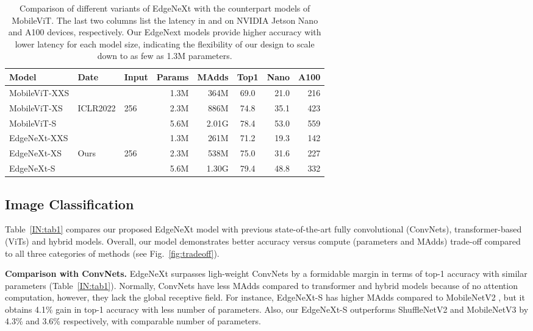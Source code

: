 \documentclass[runningheads]{llncs}
\renewcommand\arraystretch{1.0}
\begin{document}
\begin{table*}[!b]
\setlength{\tabcolsep}{4pt}
\renewcommand\arraystretch{1.0}
\caption{Comparison of different variants of EdgeNeXt with the counterpart models of MobileViT. The last two columns list the latency in  and  on NVIDIA Jetson Nano and A100 devices, respectively. Our EdgeNext models provide higher accuracy with lower latency for each model size, indicating the flexibility of our design to scale down to as few as 1.3M parameters.}
\begin{center}
\begin{tabular}{l l l r r c r r}
\toprule
\rowcolor{Gray}    Model     &   Date  & Input &  Params  & MAdds &   Top1 & Nano & A100  \\
\midrule
MobileViT-XXS  &    &  & 1.3M & 364M  & 69.0 & 21.0  & 216  \\
MobileViT-XS  &  ICLR2022  & 256 & 2.3M & 886M  & 74.8 & 35.1  & 423  \\
MobileViT-S  &    &  & 5.6M & 2.01G  & 78.4 & 53.0  & 559  \\
\midrule
\rowcolor{orange!6}  EdgeNeXt-XXS   &     &  & 1.3M & 261M & 71.2 & 19.3  & 142  \\
\rowcolor{orange!6}  EdgeNeXt-XS   &  Ours   & 256 & 2.3M & 538M & 75.0 & 31.6  &  227  \\
\rowcolor{orange!6}  EdgeNeXt-S   &     &  & 5.6M & 1.30G & 79.4 & 48.8  & 332  \\
\bottomrule 
\end{tabular}
\label{IN:tab2}
\end{center}
\end{table*}


\subsection{Image Classification}
Table~\ref{IN:tab1} compares our proposed EdgeNeXt model with previous state-of-the-art fully convolutional (ConvNets), transformer-based (ViTs) and hybrid models. Overall, our model demonstrates better accuracy versus compute (parameters and MAdds) trade-off compared to all three categories of methods (see Fig.~\ref{fig:tradeoff}). 

\noindent\textbf{Comparison with ConvNets.} EdgeNeXt surpasses ligh-weight ConvNets by a formidable margin in terms of top-1 accuracy with similar parameters (Table~\ref{IN:tab1}). Normally, ConvNets have less MAdds compared to transformer and hybrid models because of no attention computation, however, they lack the global receptive field. For instance, EdgeNeXt-S has higher MAdds compared to MobileNetV2 \cite{MobileNetV2}, but it obtains 4.1\% gain in top-1 accuracy with less number of parameters. Also, our EdgeNeXt-S outperforms ShuffleNetV2 \cite{ShuffleNetV2} and MobileNetV3 \cite{MobileNetV3} by 4.3\% and 3.6\% respectively, with comparable number of parameters.
\end{document}
